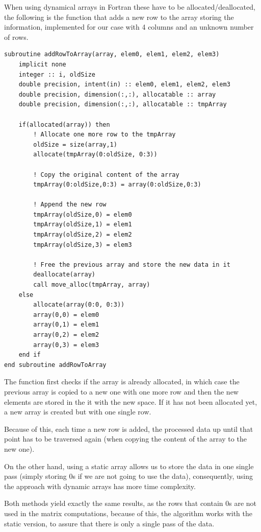 When using dynamical arrays in Fortran these have to be allocated/deallocated, the following is the function that adds a new row to the array storing the information, implemented for our case with 4 columns and an unknown number of rows.

\begin{minipage}{\linewidth}
\begin{lstlisting}[style=myFortranStyle, caption=Adding a new row to a two dimensional array]
subroutine addRowToArray(array, elem0, elem1, elem2, elem3)
	implicit none
	integer :: i, oldSize
	double precision, intent(in) :: elem0, elem1, elem2, elem3
	double precision, dimension(:,:), allocatable :: array
	double precision, dimension(:,:), allocatable :: tmpArray

	if(allocated(array)) then
		! Allocate one more row to the tmpArray
		oldSize = size(array,1)
		allocate(tmpArray(0:oldSize, 0:3)) 

		! Copy the original content of the array
		tmpArray(0:oldSize,0:3) = array(0:oldSize,0:3)

		! Append the new row
		tmpArray(oldSize,0) = elem0
		tmpArray(oldSize,1) = elem1
		tmpArray(oldSize,2) = elem2
		tmpArray(oldSize,3) = elem3

		! Free the previous array and store the new data in it
		deallocate(array)
		call move_alloc(tmpArray, array)
	else
		allocate(array(0:0, 0:3))
		array(0,0) = elem0
		array(0,1) = elem1
		array(0,2) = elem2
		array(0,3) = elem3
	end if
end subroutine addRowToArray\end{lstlisting}
\end{minipage}

The function first checks if the array is already allocated, in which case the previous array is copied to a new one with one more row and then the new elements are stored in the it with the new space. If it has not been allocated yet, a new array is created but with one single row.

Because of this, each time a new row is added, the processed data up until that point has to be traversed again (when copying the content of the array to the new one).

On the other hand, using a static array allows us to store the data in one single pass (simply storing 0s if we are not going to use the data), consequently, using the approach with dynamic arrays has more time complexity.

Both methods yield exactly the same results, as the rows that contain 0s are not used in the matrix computations, because of this, the algorithm works with the static version, to assure that there is only a single pass of the data.

